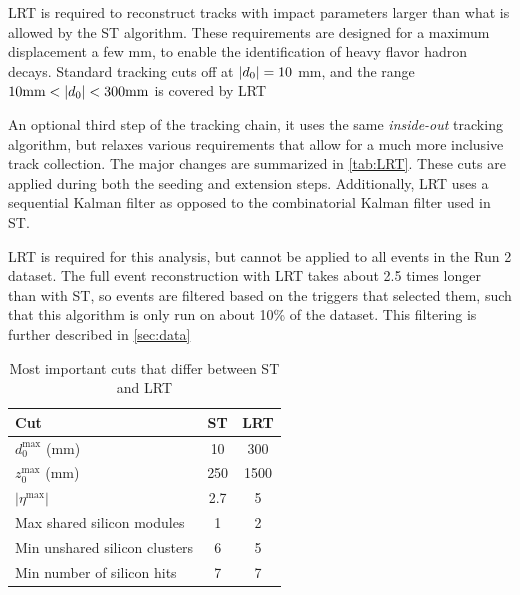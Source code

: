 \ac{LRT} \cite{lrt} is required to reconstruct tracks with impact parameters larger than what is allowed by the \ac{ST} algorithm. These requirements are designed for a maximum displacement a few mm, to enable the identification of heavy flavor hadron decays. Standard tracking cuts off at $|d_0| = 10$ mm, and the range $ 10 \text{mm} < |d_0| < 300 \text{mm}$ is covered by \ac{LRT}

An optional third step of the tracking chain, it uses the same \emph{inside-out} tracking algorithm, but relaxes various requirements that allow for a much more inclusive track collection. The major changes are summarized in \autoref{tab:LRT}. These cuts are applied during both the seeding and extension steps. Additionally, \ac{LRT} uses a sequential Kalman filter as opposed to the combinatorial Kalman filter used in \ac{ST}.

\ac{LRT} is required for this analysis, but cannot be applied to all events in the Run 2 dataset. The full event reconstruction with \ac{LRT} takes about 2.5 times longer than with \ac{ST}, so events are filtered based on the triggers that selected them, such that this algorithm is only run on about 10\% of the dataset. This filtering is further described in \autoref{sec:data}


\begin{table}
\centering
\begin{tabular}{lcc}
Cut & \ac{ST} & \ac{LRT}  \\
\hline
$d_{0}^{\textrm{max}}$ (mm)   & 10   & 300 \\
$z_{0}^{\textrm{max}}$ (mm)   & 250   & 1500 \\
$ |\eta^{\textrm{max}}|$        & 2.7   & 5 \\
Max shared silicon modules    & 1     & 2 \\
Min unshared silicon clusters   & 6     & 5 \\
Min number of silicon hits   & 7     & 7 \\
\hline
\end{tabular}
\caption{Most important cuts that differ between \ac{ST} and \ac{LRT}}
\label{tab:LRT}
\end{table}

